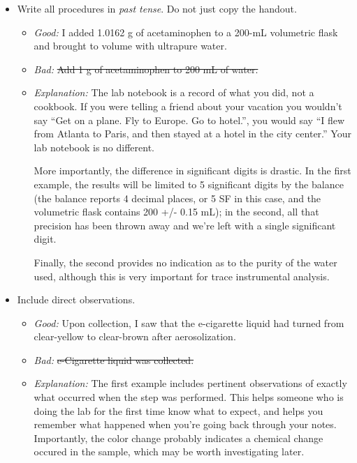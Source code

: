 \documentclass[]{tufte-book}
\begin{document}
\begin{itemize}
\item
  Write all procedures in \emph{past tense}. Do not just copy the handout.

  \begin{itemize}
  \item
    \emph{Good:} I added 1.0162 g of acetaminophen to a 200-mL volumetric flask and brought to volume with ultrapure water.
  \item
    \emph{Bad:} \sout{Add 1 g of acetaminophen to 200 mL of water.}
  \item
    \emph{Explanation:} The lab notebook is a record of what you did, not a cookbook. If you were telling a friend about your vacation you wouldn't say ``Get on a plane. Fly to Europe. Go to hotel.'', you would say ``I flew from Atlanta to Paris, and then stayed at a hotel in the city center.'' Your lab notebook is no different.

    More importantly, the difference in significant digits is drastic. In the first example, the results will be limited to 5 significant digits by the balance (the balance reports 4 decimal places, or 5 SF in this case, and the volumetric flask contains 200 +/- 0.15 mL); in the second, all that precision has been thrown away and we're left with a single significant digit.

    Finally, the second provides no indication as to the purity of the water used, although this is very important for trace instrumental analysis.
  \end{itemize}
\item
  Include direct observations.

  \begin{itemize}
  \item
    \emph{Good:} Upon collection, I saw that the e-cigarette liquid had turned from clear-yellow to clear-brown after aerosolization.
  \item
    \emph{Bad:} \sout{e-Cigarette liquid was collected.}
  \item
    \emph{Explanation:} The first example includes pertinent observations of exactly what occurred when the step was performed. This helps someone who is doing the lab for the first time know what to expect, and helps you remember what happened when you're going back through your notes. Importantly, the color change probably indicates a chemical change occured in the sample, which may be worth investigating later.
  \end{itemize}
\end{itemize}
\end{document}
